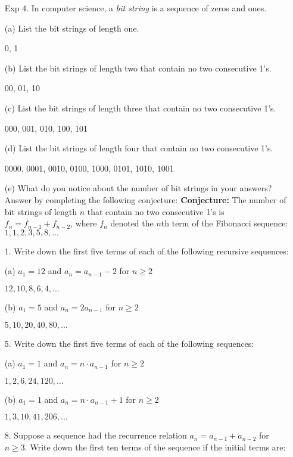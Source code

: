 \documentclass{article}
\begin{document}
\begin{itemize}
    \item[Exp 4.] In computer science, a \emph{bit string}  is a sequence of zeros and ones.
    
    (a) List the bit strings of length one.
    
    {\color{blue} 0, 1}
    
    (b) List the bit strings of length two that contain no two consecutive 1's.
    
    {\color{blue} 00, 01, 10}
    
    (c) List the bit strings of length three that contain no two consecutive 1's.
    
    {\color{blue} 000, 001, 010, 100, 101}
    
    (d) List the bit strings of length four that contain no two consecutive 1's.
    
    {\color{blue} 0000, 0001, 0010, 0100, 1000, 0101, 1010, 1001}
    
    (e) What do you notice about the number of bit strings in your answers? Answer by completing the following conjecture: \textbf{Conjecture:} The number of bit strings of length $n$ that contain no two consecutive 1's is {\color{blue} $f_n=f_{n-1}+f_{n-2}$}, where $f_n$ denoted the $n$th term of the Fibonacci sequence: $1, 1, 2, 3, 5, 8, ...$
    
    \item[1.] Write down the first five terms of each of the following recursive sequences:
    
    (a) $a_1=12$ and $a_n=a_{n-1}-2$ for $n\geq2$
    
    {\color{blue}$12,10,8,6,4,...$}
    
    (b) $a_1=5$ and $a_n=2a_{n-1}$ for $n\geq2$
    
    {\color{blue}$5,10,20,40,80,...$}
    
    \item[5.] Write down the first five terms of each of the following sequences:
    
    (a) $a_1=1$ and $a_n=n\cdot a_{n-1}$ for $n\geq2$
    
    {\color{blue}$1,2,6,24,120,...$}
    
    (b) $a_1=1$ and $a_n=n\cdot a_{n-1}+1$ for $n\geq2$
    
    {\color{blue}$1,3,10,41,206,...$}
    
    \item[8.] Suppose a sequence had the recurrence relation $a_n=a_{n-1}+a_{n-2}$ for $n\geq3$. Write down the first ten terms of the sequence if the initial terms are:
    

\end{itemize}
\end{document}
